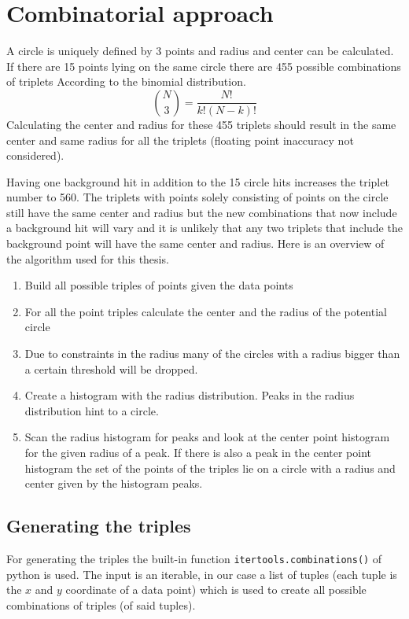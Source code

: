 \documentclass[11pt,twoside]{scrreprt}
\begin{document}
\section{Combinatorial approach}
\label{sec:combinatorial_approach}
A circle is uniquely defined by 3 points and radius and center can be calculated. If there are 15 points lying on the same circle there are 455 possible combinations of triplets According to the binomial distribution.
\[
   \binom{N}{3} = \frac{N!}{k!(N-k)!}
 \] 
Calculating the center and radius for these 455 triplets should result in the same center and same radius for all the triplets (floating point inaccuracy not considered). 

Having one background hit in addition to the 15 circle hits increases the triplet number to 560. The triplets with points solely consisting of points on the circle still have the same center and radius but the new combinations that now include a background hit will vary and it is unlikely that any two triplets that include the background point will have the same center and radius. Here is an overview of the algorithm used for this thesis.

\begin{enumerate}
\item Build all possible triples of points given the data points
\item For all the point triples calculate the center and the radius of the potential circle
\item Due to constraints in the radius many of the circles with a radius bigger than a certain threshold will be dropped.
\item Create a histogram with the radius distribution. Peaks in the radius distribution hint to a circle.
\item Scan the radius histogram for peaks and look at the center point histogram for the given radius of a peak. If there is also a peak in the center point histogram
      the set of the points of the triples lie on a circle with a radius and center given by the histogram peaks.
\end{enumerate}

\subsection{Generating the triples} %
\label{sub:generating_the_triples}
For generating the triples the built-in function \texttt{itertools.combinations()} of python is used. The input is an iterable, in our case a
list of tuples (each tuple is the $x$ and $y$ coordinate of a data point) which is used to create all possible combinations of triples (of said tuples).
\end{document}
